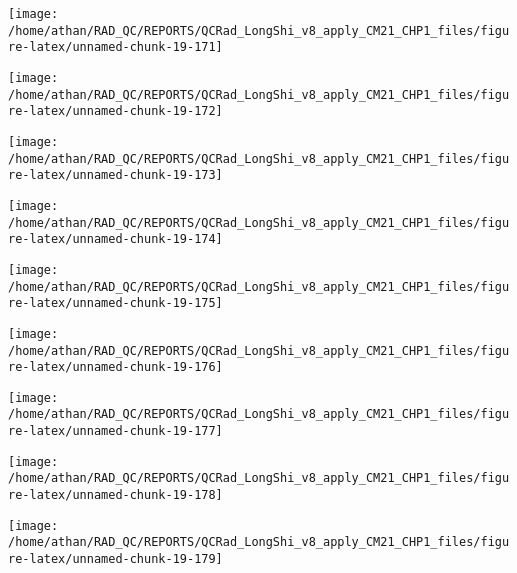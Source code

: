 \documentclass[
  10pt,
  a4paper,oneside]{article}
\begin{document}
\begin{center}\texttt{[image: /home/athan/RAD\_QC/REPORTS/QCRad\_LongShi\_v8\_apply\_CM21\_CHP1\_files/figure-latex/unnamed-chunk-19-171]} \end{center}

\begin{center}\texttt{[image: /home/athan/RAD\_QC/REPORTS/QCRad\_LongShi\_v8\_apply\_CM21\_CHP1\_files/figure-latex/unnamed-chunk-19-172]} \end{center}

\begin{center}\texttt{[image: /home/athan/RAD\_QC/REPORTS/QCRad\_LongShi\_v8\_apply\_CM21\_CHP1\_files/figure-latex/unnamed-chunk-19-173]} \end{center}

\begin{center}\texttt{[image: /home/athan/RAD\_QC/REPORTS/QCRad\_LongShi\_v8\_apply\_CM21\_CHP1\_files/figure-latex/unnamed-chunk-19-174]} \end{center}

\begin{center}\texttt{[image: /home/athan/RAD\_QC/REPORTS/QCRad\_LongShi\_v8\_apply\_CM21\_CHP1\_files/figure-latex/unnamed-chunk-19-175]} \end{center}

\begin{center}\texttt{[image: /home/athan/RAD\_QC/REPORTS/QCRad\_LongShi\_v8\_apply\_CM21\_CHP1\_files/figure-latex/unnamed-chunk-19-176]} \end{center}

\begin{center}\texttt{[image: /home/athan/RAD\_QC/REPORTS/QCRad\_LongShi\_v8\_apply\_CM21\_CHP1\_files/figure-latex/unnamed-chunk-19-177]} \end{center}

\begin{center}\texttt{[image: /home/athan/RAD\_QC/REPORTS/QCRad\_LongShi\_v8\_apply\_CM21\_CHP1\_files/figure-latex/unnamed-chunk-19-178]} \end{center}

\begin{center}\texttt{[image: /home/athan/RAD\_QC/REPORTS/QCRad\_LongShi\_v8\_apply\_CM21\_CHP1\_files/figure-latex/unnamed-chunk-19-179]} \end{center}
\end{document}
